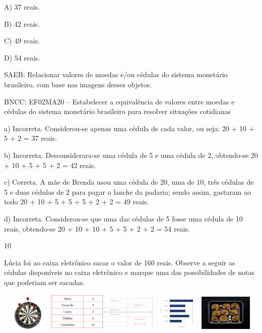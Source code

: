 \begin{escolha}
\begin{escolha}
{{{{{{{{A) 37 reais.

B) 42 reais.

C) 49 reais.

D) 54 reais.

SAEB: Relacionar valores de moedas e/ou cédulas do sistema
monetário brasileiro, com base nas imagens desses objetos.

BNCC: EF02MA20 -- Estabelecer a equivalência de valores entre moedas e
cédulas do sistema monetário brasileiro para resolver situações
cotidianas

a) Incorreta. Considerou-se apenas uma cédula de cada valor, ou seja: 20 +
10 + 5 + 2 = 37 reais.

b) Incorreta. Desconsiderara-se uma cédula de 5 e uma cédula de 2, obtendo-se
20 + 10 + 5 + 5 + 2 = 42 reais.

c) Correta. A mãe de Brenda usou uma cédula de 20, uma de 10, três
cédulas de 5 e duas cédulas de 2 para pagar o lanche da padaria; sendo
assim, gastaram ao todo 20 + 10 + 5 + 5 + 5 + 2 + 2 = 49 reais.

d) Incorreta. Considerou-se que uma das cédulas de 5 fosse uma cédula de 10
reais, obtendo-se 20 + 10 + 10 + 5 + 5 + 2 + 2 = 54 reais.

\num{10}

Lúcia foi ao caixa eletrônico sacar o valor de 160 reais. Observe a seguir
as cédulas disponíveis no caixa eletrônico e marque uma das
possibilidades de notas que poderiam ser sacadas.

\includegraphics[width=0.98131in,height=0.65625in]{media/image108.png}\includegraphics[width=1.06299in,height=0.71087in]{media/image157.png}\includegraphics[width=1.02736in,height=0.68704in]{media/image110.png}\includegraphics[width=1.01480in,height=0.67865in]{media/image158.png}\includegraphics[width=0.99484in,height=0.66530in]{media/image159.png}

}}}}}}}}
\end{escolha}
\end{escolha}
